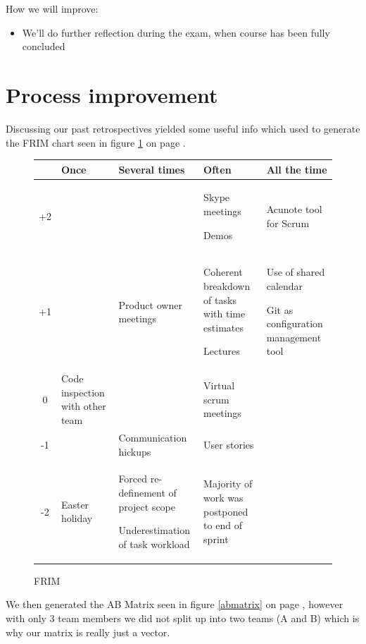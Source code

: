 \documentclass[a4paper,11pt]{article}
\begin{document}
\noindent
How we will improve:
\begin{itemize}
\item We’ll do further reflection during the exam, when course has been fully concluded
\end{itemize}

\section{Process improvement}

Discussing our past retrospectives yielded some useful info which used to generate the FRIM chart seen in figure \ref{frim} on page \pageref{frim}.

\begin{figure}
	\centering
	\begin{tabular}{|c|p{3cm}|p{3cm}|p{3cm}|p{3cm}|}
	\hline
		& Once & Several times & Often & All the time \\\hline
	+2  & & & Skype meetings \par\vspace{.3cm} Demos & Acunote tool for Scrum \\\hline
	+1  & & Product owner meetings & Coherent breakdown of tasks with time estimates \par\vspace{.3cm} Lectures & Use of shared calendar \par\vspace{.3cm} Git as configuration management tool \\\hline
	 0  & Code inspection with other team & & Virtual scrum meetings & \\\hline
	-1  & & Communication hickups & User stories & \\\hline
	-2  & Easter holiday & Forced re-definement of project scope \par\vspace{.3cm} Underestimation of task workload & Majority of work was postponed to end of sprint & \\\hline
	\end{tabular}	
	\caption{FRIM}
	\label{frim}
\end{figure}

We then generated the AB Matrix seen in figure \ref{abmatrix} on page \pageref{abmatrix}, however with only 3 team members we did not split up into two teams (A and B) which is why our matrix is really just a vector.
\end{document}
